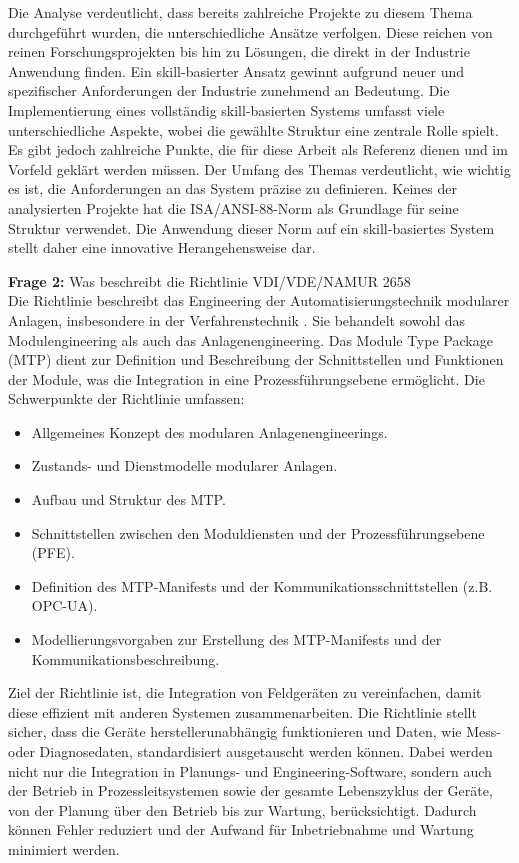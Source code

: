 	\newpage
	
	Die Analyse verdeutlicht, dass bereits zahlreiche Projekte zu diesem Thema durchgeführt wurden, die unterschiedliche Ansätze verfolgen. Diese reichen von reinen Forschungsprojekten bis hin zu Lösungen, die direkt in der Industrie Anwendung finden. Ein skill-basierter Ansatz gewinnt aufgrund neuer und spezifischer Anforderungen der Industrie zunehmend an Bedeutung.
	Die Implementierung eines vollständig skill-basierten Systems umfasst viele unterschiedliche Aspekte, wobei die gewählte Struktur eine zentrale Rolle spielt. Es gibt jedoch zahlreiche Punkte, die für diese Arbeit als Referenz dienen und im Vorfeld geklärt werden müssen. Der Umfang des Themas verdeutlicht, wie wichtig es ist, die Anforderungen an das System präzise zu definieren.
	Keines der analysierten Projekte hat die ISA/ANSI-88-Norm als Grundlage für seine Struktur verwendet. Die Anwendung dieser Norm auf ein skill-basiertes System stellt daher eine innovative Herangehensweise dar.
	\vspace{3mm}
	
	\textbf{Frage 2:} Was beschreibt die Richtlinie VDI/VDE/NAMUR 2658 \vspace{2mm} 
	\\
	Die Richtlinie beschreibt das Engineering der Automatisierungstechnik modularer Anlagen, insbesondere in der Verfahrenstechnik . Sie behandelt sowohl das Modulengineering als auch das Anlagenengineering. Das Module Type Package (\Gls{MTP}) dient zur Definition und Beschreibung der Schnittstellen und Funktionen der Module, was die Integration in eine Prozessführungsebene ermöglicht. Die Schwerpunkte der Richtlinie umfassen:
	\begin{itemize}
		\item Allgemeines Konzept des modularen Anlagenengineerings.
		\item Zustands- und Dienstmodelle modularer Anlagen.
		\item Aufbau und Struktur des \Gls{MTP}.
		\item Schnittstellen zwischen den Moduldiensten und der Prozessführungsebene (PFE).
		\item Definition des \Gls{MTP}-Manifests und der Kommunikationsschnittstellen (z.B. OPC-UA).
		\item Modellierungsvorgaben zur Erstellung des \Gls{MTP}-Manifests und der Kommunikationsbeschreibung.
	\end{itemize}
	Ziel der Richtlinie ist, die Integration von Feldgeräten zu vereinfachen, damit diese effizient mit anderen Systemen zusammenarbeiten. Die Richtlinie stellt sicher, dass die Geräte herstellerunabhängig funktionieren und Daten, wie Mess- oder Diagnosedaten, standardisiert ausgetauscht werden können. Dabei werden nicht nur die Integration in Planungs- und Engineering-Software, sondern auch der Betrieb in Prozessleitsystemen sowie der gesamte Lebenszyklus der Geräte, von der Planung über den Betrieb bis zur Wartung, berücksichtigt. Dadurch können Fehler reduziert und der Aufwand für Inbetriebnahme und Wartung minimiert werden.
	\vspace{3mm}
	
